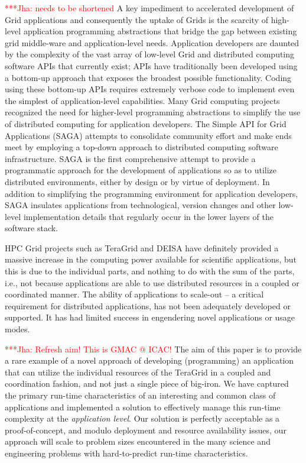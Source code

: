 \documentclass[conference,final]{IEEEtran}
\newcommand{\jhanote}[1]{ {\textcolor{red} { ***Jha: #1 }}}
\begin{document}
\jhanote{needs to be shortened} A key impediment to accelerated
development of Grid applications and consequently the uptake of Grids
is the scarcity of high-level application programming abstractions
that bridge the gap between existing grid middle-ware and
application-level needs.  Application developers are daunted by the
complexity of the vast array of low-level Grid and distributed
computing software APIs that currently exist; APIs have traditionally
been developed using a bottom-up approach that exposes the broadest
possible functionality.  Coding using these bottom-up APIs requires
extremely verbose code to implement even the simplest of
application-level capabilities.  Many Grid computing
projects~\cite{gat, cog, realitygrid} recognized the need for
higher-level programming abstractions to simplify the use of
distributed computing for application developers.  The Simple API for
Grid Applications (SAGA) attempts to consolidate community effort and
make ends meet by employing a top-down approach to distributed
computing software infrastructure.  SAGA is the first comprehensive
attempt to provide a programmatic approach for the development of
applications so as to utilize distributed environments, either by
design or by virtue of deployment.  In addition to simplifying the
programming environment for application developers, SAGA insulates
applications from technological, version changes and other low-level
implementation details that regularly occur in the lower layers of the
software stack.

HPC Grid projects such as TeraGrid and DEISA have definitely provided
a massive increase in the computing power available for scientific
applications, but this is due to the individual parts, and nothing to
do with the sum of the parts, i.e., not because applications are able
to use distributed resources in a coupled or coordinated manner. The
ability of applications to scale-out -- a critical requirement for
distributed applications, has not been adequately developed or
supported. It has had limited success in engendering novel
applications or usage modes.


\jhanote{Refresh aim! This is GMAC @ ICAC!}  The aim of this paper is
to provide a rare example of a novel approach of developing
(programming) an application that can utilize the individual resources
of the TeraGrid in a coupled and coordination fashion, and not just a
single piece of big-iron.  We have captured the primary run-time
characteristics of an interesting and common class of applications and
implemented a solution to effectively manage this run-time complexity
at the {\it application level}.  Our solution is perfectly acceptable
as a proof-of-concept, and modulo deployment and resource availability
issues, our approach will scale to problem sizes encountered in the
many science and engineering problems with hard-to-predict run-time
characteristics.
\end{document}
